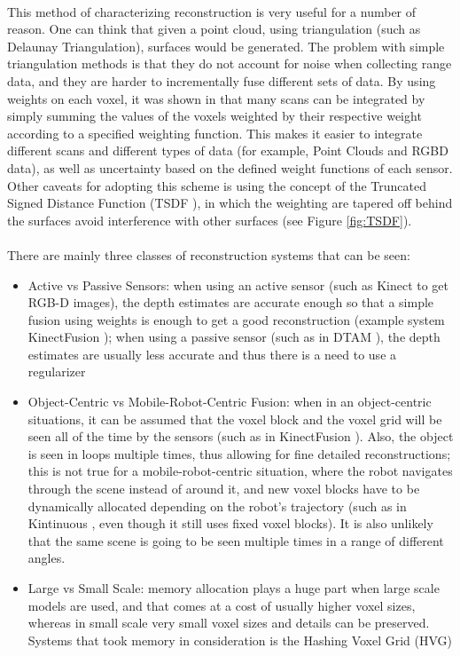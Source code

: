 \documentclass[12pt]{article}
\begin{document}
	\paragraph{}
	This method of characterizing reconstruction is very useful for a number of reason. One can think that given a point cloud, using triangulation (such as Delaunay Triangulation), surfaces would be generated. The problem with simple triangulation methods is that they do not account for noise when collecting range data, and they are harder to incrementally fuse different sets of data. By using weights on each voxel, it was shown in \cite{TSDF} that many scans can be integrated by simply summing the values of the voxels weighted by their respective weight according to a specified weighting function. This makes it easier to integrate different scans and different types of data (for example, Point Clouds and RGBD data), as well as uncertainty based on the defined weight functions of each sensor. Other caveats for adopting this scheme is using the concept of the Truncated Signed Distance Function (TSDF \cite{TSDF}), in which the weighting are tapered off behind the surfaces avoid interference with other surfaces (see Figure \ref{fig:TSDF}).
	
	\paragraph{}
	There are mainly three classes of reconstruction systems that can be seen:
	\begin{itemize}
		\item Active vs Passive Sensors: when using an active sensor (such as Kinect to get RGB-D images), the depth estimates are accurate enough so that a simple fusion using weights is enough to get a good reconstruction (example system KinectFusion \cite{kinectfusion}); when using a passive sensor (such as in DTAM \cite{DTAM}), the depth estimates are usually less accurate and thus there is a need to use a regularizer
		\item Object-Centric vs Mobile-Robot-Centric Fusion: when in an object-centric situations, it can be assumed that the voxel block and the voxel grid will be seen all of the time by the sensors (such as in KinectFusion \cite{kinectfusion}). Also, the object is seen in loops multiple times, thus allowing for fine detailed reconstructions; this is not true for a mobile-robot-centric situation, where the robot navigates through the scene instead of around it, and new voxel blocks have to be dynamically allocated depending on the robot's trajectory (such as in Kintinuous \cite{kintinuous}, even though it still uses fixed voxel blocks). It is also unlikely that the same scene is going to be seen multiple times in a range of different angles.
		\item Large vs Small Scale: memory allocation plays a huge part when large scale models are used, and that comes at a cost of usually higher voxel sizes, whereas in small scale very small voxel sizes and details can be preserved. Systems that took memory in consideration is the Hashing Voxel Grid (HVG) \cite{HVG}
	\end{itemize}
	
\end{document}

